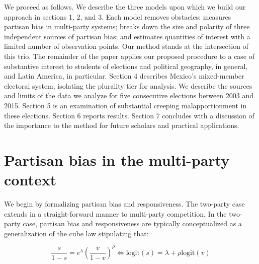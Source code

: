 \documentclass[letter,12pt]{article}
\begin{document}

We proceed as follows. We describe the three models upon which we build our approach in sections 1, 2, and 3. Each model removes obstacles: \citet{king.1990elRespBiasMultiparty} measures partisan bias in multi-party systems; \citet{grofman.etalBiasMalapp.1997} breaks down the size and polarity of three independent sources of partisan bias; and \citet{linzerSeatVoteElasticity2012} estimates quantities of interest with a limited number of observation points. Our method stands at the intersection of this trio. The remainder of the paper applies our proposed procedure to a case of substantive interest to students of elections and political geography, in general, and Latin America, in particular. Section 4 describes Mexico's mixed-member electoral system, isolating the plurality tier for analysis. We describe the sources and limits of the data we analyze for five consecutive elections between 2003 and 2015. Section 5 is an examination of substantial creeping malapportionment in these elections. Section 6 reports results. Section 7 concludes with a discussion of the importance to the method for future scholars and practical applications. 

\section{Partisan bias in the multi-party context}

We begin by formalizing partisan bias and responsiveness. The two-party case \citep{taagepera.CubeLaw.1973,tufte1973seatsVotes,king.browning1987biasRespUS} extends in a straight-forward manner to multi-party competition. In the two-party case, partisan bias and responsiveness are typically conceptualized as a generalization of the cube law stipulating that:

\begin{equation}\label{E:kingBi}
 \frac{s}{1-s} = e^\lambda  \left(\frac{v}{1-v}\right)^\rho \iff
 \text{logit}(s) = \lambda + \rho  \text{logit}(v)
\end{equation}\label{E:cubeLaw}
\end{document}
